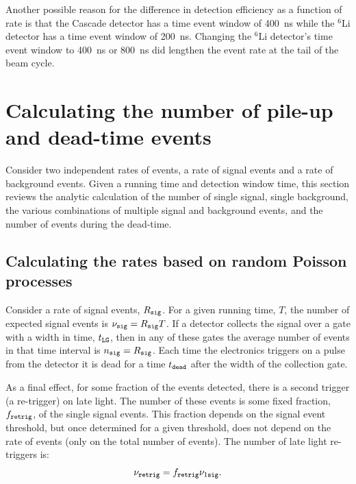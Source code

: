 \documentclass[review]{elsarticle}
\begin{document}
Another possible reason for the difference in detection efficiency as
a function of rate is that the Cascade detector has a time event
window of 400~ns while the $^6$Li detector has a time event window of
200~ns.  Changing the $^6$Li detector's time event window to 400~ns or
800~ns did lengthen the event rate at the tail of the beam cycle.


\section{Calculating the number of pile-up and dead-time events}\label{sec:stats}

Consider two independent rates of events, a rate of signal events and
a rate of background events.  Given a running time and detection
window time, this section reviews the analytic calculation of the
number of single signal, single background, the various combinations
of multiple signal and background events, and the number of events
during the dead-time.

\subsection{Calculating the rates based on random Poisson processes}

Consider a rate of signal events, $R_{\tt sig}$.  For a given running
time, $T$, the number of expected signal events is $\nu_{\tt sig} =
R_{\tt sig} T$.  If a detector collects the signal over a gate with a
width in time, $t_{\tt LG}$, then in any of these gates the average
number of events in that time interval is $n_{\tt sig} = R_{\tt sig}$.
Each time the electronics triggers on a pulse from the detector it is
dead for a time $t_{\tt dead}$ after the width of the collection gate.

As a final effect, for some fraction of the events detected, there is
a second trigger (a re-trigger) on late light.  The number of these
events is some fixed fraction, $f_{\tt retrig}$, of the single signal
events.  This fraction depends on the signal event threshold, but once
determined for a given threshold, does not depend on the rate of
events (only on the total number of events).  The number of late light
re-triggers is:
\begin{equation}\label{eq:retrig}
\nu_{\tt retrig} = f_{\tt retrig} \nu_{1\tt sig}.
\end{equation}
\end{document}
